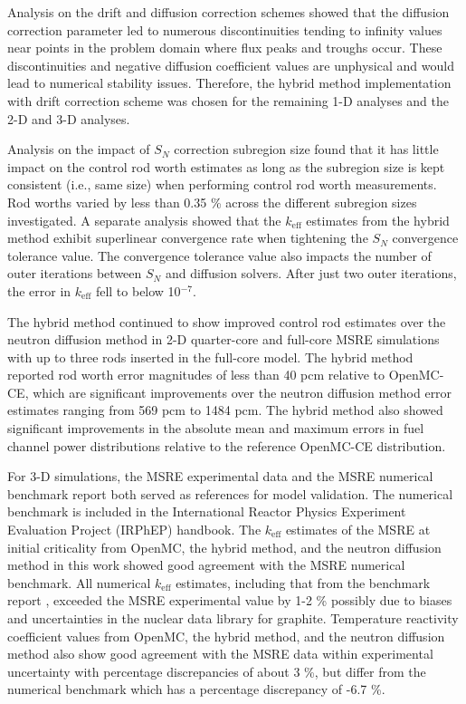 Analysis on the drift and diffusion correction schemes showed that the diffusion correction
parameter led to numerous discontinuities tending to infinity values near points in the problem
domain where flux peaks and troughs occur. These discontinuities and negative diffusion coefficient
values are unphysical and would lead to numerical stability issues. Therefore, the hybrid method
implementation with drift correction scheme was chosen for the remaining 1-D analyses and the
2-D and 3-D analyses.

Analysis on the impact of $S_N$ correction subregion size found that it has little impact on the
control rod worth estimates as long as the subregion size is kept consistent (i.e., same size) when
performing control rod worth measurements. Rod worths varied by less than 0.35 \% across the
different subregion sizes investigated. A separate analysis showed that the $k_\text{eff}$
estimates from the hybrid method exhibit superlinear convergence rate when tightening the $S_N$
convergence tolerance value. The convergence tolerance value also impacts the number of outer
iterations between $S_N$ and diffusion solvers. After just two outer iterations, the error in
$k_\text{eff}$ fell to below 10$^{-7}$.

The hybrid method continued to show improved control rod estimates over the neutron diffusion
method in 2-D quarter-core and full-core \gls{MSRE} simulations with up to three rods inserted in the
full-core model. The hybrid method reported rod worth error magnitudes of less than 40 pcm relative
to OpenMC-CE, which are significant improvements over the neutron diffusion method error estimates
ranging from 569 pcm to 1484 pcm. The hybrid method also showed significant improvements in the
absolute mean and maximum errors in fuel channel power distributions relative to the reference
OpenMC-CE distribution.

For 3-D simulations, the \gls{MSRE} experimental data and the \gls{MSRE} numerical benchmark
report \cite{fratoni_molten_2020} both served as references for model validation. The numerical
benchmark is included in the International Reactor Physics Experiment Evaluation Project (IRPhEP)
handbook. The
$k_\text{eff}$ estimates of the \gls{MSRE} at initial criticality from OpenMC, the hybrid method,
and the neutron diffusion method in this work showed good agreement with the \gls{MSRE} numerical
benchmark. All numerical $k_\text{eff}$ estimates, including that from the benchmark report
\cite{fratoni_molten_2020}, exceeded the \gls{MSRE} experimental value by 1-2 \% possibly due to
biases and uncertainties in the nuclear data library for graphite. Temperature reactivity
coefficient values from OpenMC, the hybrid method, and the neutron diffusion method also show good
agreement with the \gls{MSRE} data within experimental uncertainty with percentage discrepancies of
about 3 \%, but differ from the numerical benchmark which has a percentage discrepancy of -6.7 \%.

